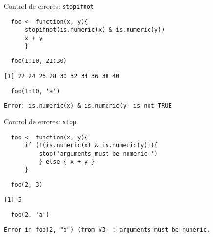 \documentclass[xcolor={usenames,svgnames,dvipsnames}]{beamer}
\begin{document}
\begin{frame}[fragile,label={sec:orgheadline10}]{Control de errores: \texttt{stopifnot}}
 \lstset{language=R,label= ,caption= ,captionpos=b,numbers=none}
\begin{lstlisting}
  foo <- function(x, y){
      stopifnot(is.numeric(x) & is.numeric(y))
      x + y
      }
\end{lstlisting}

\lstset{language=R,label= ,caption= ,captionpos=b,numbers=none}
\begin{lstlisting}
  foo(1:10, 21:30)
\end{lstlisting}

\begin{verbatim}
[1] 22 24 26 28 30 32 34 36 38 40
\end{verbatim}

\lstset{language=R,label= ,caption= ,captionpos=b,numbers=none}
\begin{lstlisting}
  foo(1:10, 'a')
\end{lstlisting}

\begin{verbatim}
Error: is.numeric(x) & is.numeric(y) is not TRUE
\end{verbatim}
\end{frame}

\begin{frame}[fragile,label={sec:orgheadline11}]{Control de errores: \texttt{stop}}
 \lstset{language=R,label= ,caption= ,captionpos=b,numbers=none}
\begin{lstlisting}
  foo <- function(x, y){
      if (!(is.numeric(x) & is.numeric(y))){
          stop('arguments must be numeric.')
          } else { x + y }
      }
\end{lstlisting}

\lstset{language=R,label= ,caption= ,captionpos=b,numbers=none}
\begin{lstlisting}
  foo(2, 3)
\end{lstlisting}

\begin{verbatim}
[1] 5
\end{verbatim}

\lstset{language=R,label= ,caption= ,captionpos=b,numbers=none}
\begin{lstlisting}
  foo(2, 'a')
\end{lstlisting}

\begin{verbatim}
Error in foo(2, "a") (from #3) : arguments must be numeric.
\end{verbatim}
\end{frame}
\end{document}
